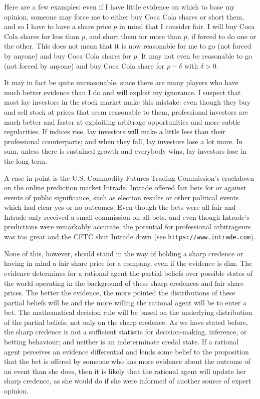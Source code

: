 Here are a few examples: even if I have little evidence on which to base my opinion, someone may force me to either buy Coca Cola shares or short them, and so I have to have a share price $p$ in mind that I consider fair. I will buy Coca Cola shares for less than $p$, and short them for more than $p$, if forced to do one or the other. This does not mean that it is now reasonable for me to go (not forced by anyone) and buy Coca Cola shares for $p$. It may not even be reasonable to go (not forced by anyone) and buy Coca Cola share for $p-\delta$ with $\delta{}>0$.

It may in fact be quite unreasonable, since there are many players who have much better evidence than I do and will exploit my ignorance. I suspect that most lay investors in the stock market make this mistake: even though they buy and sell stock at prices that seem reasonable to them, professional investors are much better and faster at exploiting arbitrage opportunities and more subtle regularities. If indices rise, lay investors will make a little less than their professional counterparts; and when they fall, lay investors lose a lot more. In sum, unless there is sustained growth and everybody wins, lay investors lose in the long term.

A case in point is the U.S. Commodity Futures Trading Commission's crackdown on the online prediction market Intrade. Intrade offered fair bets for or against events of public significance, such as election results or other political events which had clear yes-or-no outcomes. Even though the bets were all fair and Intrade only received a small commission on all bets, and even though Intrade's predictions were remarkably accurate, the potential for professional arbitrageurs was too great and the CFTC shut Intrade down (see \texttt{https://www.intrade.com}).

None of this, however, should stand in the way of holding a sharp credence or having in mind a fair share price for a company, even if the evidence is dim. The evidence determines for a rational agent the partial beliefs over possible states of the world operating in the background of these sharp credences and fair share prices. The better the evidence, the more pointed the distributions of these partial beliefs will be and the more willing the rational agent will be to enter a bet. The mathematical decision rule will be based on the underlying distribution of the partial beliefs, not only on the sharp credence. As we have stated before, the sharp credence is not a sufficient statistic for decision-making, inference, or betting behaviour; and neither is an indeterminate credal state. If a rational agent perceives an evidence differential and lends some belief to the proposition that the bet is offered by someone who has more evidence about the outcome of an event than she does, then it is likely that the rational agent will update her sharp credence, as she would do if she were informed of another source of expert opinion.

